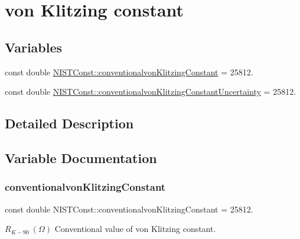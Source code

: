 \hypertarget{group___conventionalvon_klitzing_constant}{}\section{von Klitzing constant}
\label{group___conventionalvon_klitzing_constant}
\subsection*{Variables}
\begin{DoxyCompactItemize}
\item 
const double \hyperlink{group___conventionalvon_klitzing_constant_gabf641ec13f8a8d63762992724dd6d670}{N\+I\+S\+T\+Const\+::conventionalvon\+Klitzing\+Constant} = 25812.
\item 
const double \hyperlink{group___conventionalvon_klitzing_constant_gad820d4afd8b26103c01023bf69ac749b}{N\+I\+S\+T\+Const\+::conventionalvon\+Klitzing\+Constant\+Uncertainty} = 25812.
\end{DoxyCompactItemize}


\subsection{Detailed Description}


\subsection{Variable Documentation}
\mbox{\label{group___conventionalvon_klitzing_constant_gabf641ec13f8a8d63762992724dd6d670}} 
\subsubsection{\texorpdfstring{conventionalvon\+Klitzing\+Constant}{conventionalvonKlitzingConstant}}
{\footnotesize\ttfamily const double N\+I\+S\+T\+Const\+::conventionalvon\+Klitzing\+Constant = 25812.}

$R_{K-90} \ (\Omega)$ Conventional value of von Klitzing constant. \mbox{\label{group___conventionalvon_klitzing_constant_gad820d4afd8b26103c01023bf69ac749b}} 
